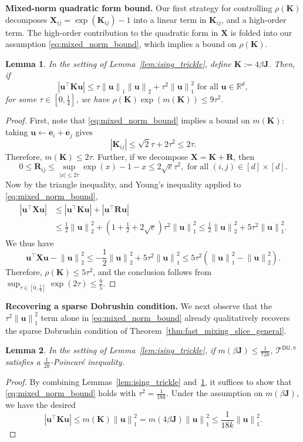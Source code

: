\documentclass[11pt]{article}
\newtheorem{lemma}{Lemma}
\newcommand{\defeq}{:=}
\newcommand{\norm}[1]{\left\lVert#1\right\rVert}
\newcommand{\R}{\mathbb{R}}
\newcommand{\half}{\frac{1}{2}}
\newcommand{\1}{\mathbf{1}}
\newcommand{\0}{\mathbf{0}}
\newcommand{\Par}[1]{\left(#1\right)}
\newcommand{\Abs}[1]{\left|#1\right|}
\newcommand{\mj}{{\mathbf{J}}}
\newcommand{\mk}{{\mathbf{K}}}
\newcommand{\mr}{{\mathbf{R}}}
\newcommand{\mx}{{\mathbf{X}}}
\newcommand{\ve}{{\mathbf{e}}}
\newcommand{\vu}{{\mathbf{u}}}
\newcommand{\calT}{{\mathcal{T}}}
\newcommand{\TDU}[1]{\calT^{\mathsf{DU}, #1}}
\begin{document}
\textbf{Mixed-norm quadratic form bound.} Our first strategy for controlling $\rho(\mk)$ decomposes $\mx_{ij} = \exp(\mk_{ij}) - 1$ into a linear term in $\mk_{ij}$, and a high-order term. The high-order contribution to the quadratic form in $\mx$ is folded into our assumption \eqref{eq:mixed_norm_bound}, which implies a bound on $\rho(\mk)$.

\begin{lemma}\label{lem:mixed_quadratic}
In the setting of Lemma~\ref{lem:ising_trickle}, define $\mk \defeq 4\beta\mj$. Then, if 
\begin{equation}\label{eq:mixed_norm_bound}\Abs{\vu^\top \mk \vu} \le \tau\norm{\vu}_1\norm{\vu}_2 + \tau^2 \norm{\vu}_1^2\text{ for all } \vu \in \R^d,\end{equation}
for some $\tau \in [0, \frac 1 4]$, we have $\rho(\mk)\exp(m(\mk)) \le 9\tau^2$.
\end{lemma}
\begin{proof}
First, note that \eqref{eq:mixed_norm_bound} implies a bound on $m(\mk)$: taking $\vu \gets \ve_i + \ve_j$ gives
\[\Abs{\mk_{ij}} \le \sqrt 2 \tau + 2\tau^2 \le 2\tau.\]
Therefore, $m(\mk) \le 2\tau$. Further, if we decompose $\mx = \mk + \mr$, then
\[0 \le \mr_{ij} \le \sup_{|x| \le 2\tau} \exp(x) - 1 - x \le 2\sqrt{e}\tau^2, \text{ for all } (i, j) \in [d] \times [d].\]
Now by the triangle inequality, and Young's inequality applied to \eqref{eq:mixed_norm_bound},
\begin{align*}\Abs{\vu^\top \mx \vu} &\le \Abs{\vu^\top \mk \vu} + \Abs{\vu^\top \mr \vu} \\
&\le \half \norm{\vu}_2^2 + \Par{1 + \half + 2\sqrt e}\tau^2\norm{\vu}_1^2 \le \half\norm{\vu}_2^2 + 5\tau^2\norm{\vu}_1^2.
\end{align*}
We thus have
\[\vu^\top \mx \vu - \norm{\vu}_2^2 \le -\half\norm{\vu}_2^2 + 5\tau^2\norm{\vu}_1^2 \le 5\tau^2\Par{\norm{\vu}_1^2 - \norm{\vu}_2^2}.\]
Therefore, $\rho(\mk) \le 5\tau^2$, and the conclusion follows from
$\sup_{\tau \in [0, \frac 1 4]} \exp\Par{2\tau} \le \frac 9 5$.
\end{proof}

\textbf{Recovering a sparse Dobrushin condition.} We next observe that the $\tau^2 \norm{\vu}_1^2$ term alone in \eqref{eq:mixed_norm_bound} already qualitatively recovers the sparse Dobrushin condition of Theorem~\ref{thm:fast_mixing_slice_general}.

\begin{lemma}\label{lem:max_entry_recover}
In the setting of Lemma~\ref{lem:ising_trickle}, if $m(\beta \mj) \le \frac 1 {72k}$, $\TDU{\pi}$ satisfies a $\frac 1 {2k}$-Poincar\'e inequality.
\end{lemma}
\begin{proof}
By combining Lemmas~\ref{lem:ising_trickle} and~\ref{lem:mixed_quadratic}, it suffices to show that \eqref{eq:mixed_norm_bound} holds with $\tau^2 = \frac 1 {18k}$. Under the assumption on $m(\beta\mj)$, we have the desired
\[\Abs{\vu^\top \mk \vu} \le m(\mk)\norm{\vu}_1^2= m(4\beta\mj)\norm{\vu}_1^2 \le \frac 1 {18k}\norm{\vu}_1^2.\]
\end{proof}
\end{document}
